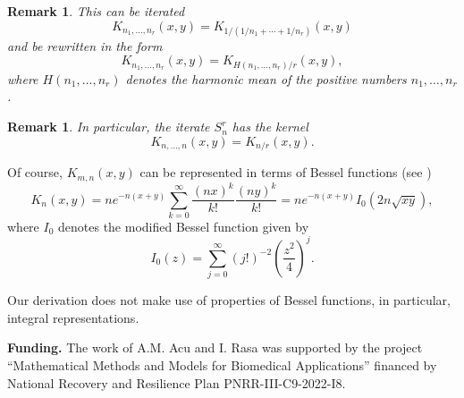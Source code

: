 \documentclass[12pt,reqno]{article}
\newtheorem{remark}[theorem]{Remark}
\begin{document}
\begin{remark}
This can be iterated 
\begin{equation*}
K_{n_{1},\ldots ,n_{r}}\left( x,y\right) =K_{1/\left( 1/n_{1}+\cdots
+1/n_{r}\right) }\left( x,y\right)
\end{equation*}%
and be rewritten in the form 
\begin{equation*}
K_{n_{1},\ldots ,n_{r}}\left( x,y\right) =K_{H\left( n_{1},\ldots
,n_{r}\right) /r}\left( x,y\right) ,
\end{equation*}%
where $H\left( n_{1},\ldots ,n_{r}\right) $ denotes the harmonic mean of the
positive numbers $n_{1},\ldots ,n_{r}$.
\end{remark}

\begin{remark}
In particular, the iterate $S_{n}^{r}$ has the kernel 
\begin{equation*}
K_{n,\ldots ,n}\left( x,y\right) =K_{n/r}\left( x,y\right) .
\end{equation*}
\end{remark}
Of course, $K_{m,n}\left( x,y\right) $ can be represented in terms of Bessel
functions (see \cite{Abel-Ivan-Varna-CTF2005-proc-2006}) 
\begin{equation*}
K_n(x,y)=ne^{-n(x+y)}\displaystyle \sum_{k=0}^{\infty}\dfrac{(nx)^k}{k!}%
\dfrac{(ny)^k}{k!}=ne^{-n(x+y)}I_0(2n\sqrt{xy}),
\end{equation*}
where $I_0$ denotes the modified Bessel function given by 
\begin{equation*}
I_0(z)=\displaystyle \sum_{j=0}^{\infty}(j!)^{-2}\left(\dfrac{z^2}{4}%
\right)^j.
\end{equation*}

Our derivation does not make use of properties of Bessel functions, in
particular, integral representations.


\strut

\noindent
{\bf Funding.} The work of A.M. Acu and I. Rasa was supported by the project
``Mathematical Methods and Models for Biomedical Applications'' financed by
National Recovery and Resilience Plan PNRR-III-C9-2022-I8.

\strut
\end{document}
